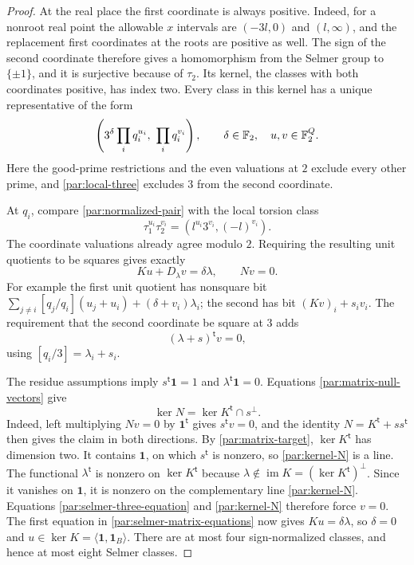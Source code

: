 \begin{proof}
At the real place the first coordinate is always positive. Indeed,
for a nonroot real point the allowable $x$ intervals are
$(-3l,0)$ and $(l,\infty)$, and the replacement first coordinates
at the roots are positive as well. The sign of the second coordinate
therefore gives a homomorphism from the Selmer group to
$\{\pm1\}$, and it is surjective because of $\tau_2$. Its kernel,
the classes with both coordinates positive, has index two.
Every class in this kernel has a unique representative of the form
\begin{equation}\label{par:normalized-pair}
 \left(3^\delta\prod_iq_i^{u_i},\ \prod_iq_i^{v_i}\right),
 \qquad \delta\in\mathbb F_2,\quad u,v\in\mathbb F_2^Q.
\end{equation}
Here the good-prime restrictions and the even valuations at $2$
exclude every other prime, and \eqref{par:local-three} excludes
$3$ from the second coordinate.

At $q_i$, compare \eqref{par:normalized-pair} with the local
torsion class
\[
 \tau_1^{u_i}\tau_2^{v_i}
   =(l^{u_i}3^{v_i},(-l)^{v_i}).
\]
The coordinate valuations already agree modulo $2$. Requiring
the resulting unit quotients to be squares gives exactly
\begin{equation}\label{par:selmer-matrix-equations}
 Ku+D_\lambda v=\delta\lambda,\qquad Nv=0.
\end{equation}
For example the first unit quotient has nonsquare bit
$\sum_{j\ne i}[q_j/q_i](u_j+u_i)+(\delta+v_i)\lambda_i$;
the second has bit $(Kv)_i+s_iv_i$. The requirement that the
second coordinate be square at $3$ adds
\begin{equation}\label{par:selmer-three-equation}
 (\lambda+s)^{\mathsf t}v=0,
\end{equation}
using $[q_i/3]=\lambda_i+s_i$.

The residue assumptions imply
$s^{\mathsf t}\mathbf1=1$ and $\lambda^{\mathsf t}\mathbf1=0$.
Equations \eqref{par:matrix-null-vectors} give
\begin{equation}\label{par:kernel-N}
 \ker N=\ker K^{\mathsf t}\cap s^\perp.
\end{equation}
Indeed, left multiplying $Nv=0$ by $\mathbf1^{\mathsf t}$
gives $s^{\mathsf t}v=0$, and the identity
$N=K^{\mathsf t}+ss^{\mathsf t}$ then gives the claim in both
directions. By \eqref{par:matrix-target}, $\ker K^{\mathsf t}$
has dimension two. It contains $\mathbf1$, on which
$s^{\mathsf t}$ is nonzero, so \eqref{par:kernel-N} is a line.
The functional $\lambda^{\mathsf t}$ is nonzero on
$\ker K^{\mathsf t}$ because
$\lambda\notin\operatorname{im}K=(\ker K^{\mathsf t})^\perp$.
Since it vanishes on $\mathbf1$, it is nonzero on the complementary
line \eqref{par:kernel-N}. Equations
\eqref{par:selmer-three-equation} and \eqref{par:kernel-N}
therefore force $v=0$. The first equation in
\eqref{par:selmer-matrix-equations} now gives
$Ku=\delta\lambda$, so $\delta=0$ and
$u\in\ker K=\langle\mathbf1,\mathbf1_B\rangle$.
There are at most four sign-normalized classes, and hence at
most eight Selmer classes.


\end{proof}
